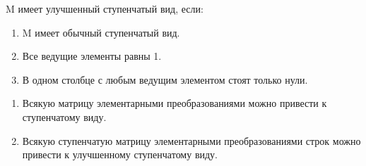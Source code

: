 \begin{definition}
    M имеет улучшенный ступенчатый вид, если:

    \begin{enumerate}
    \item M имеет обычный ступенчатый вид.
    \item Все ведущие элементы равны 1.
    \item В одном столбце с любым ведущим элементом стоят только нули.
    \end{enumerate}
\end{definition}


\begin{theorem}
    \begin{enumerate}
    \item Всякую матрицу элементарными преобразованиями можно привести к ступенчатому виду.
    \item Всякую ступенчатую матрицу элементарными преобразованиями строк можно привести к улучшенному ступенчатому виду.
    \end{enumerate}
\end{theorem}

